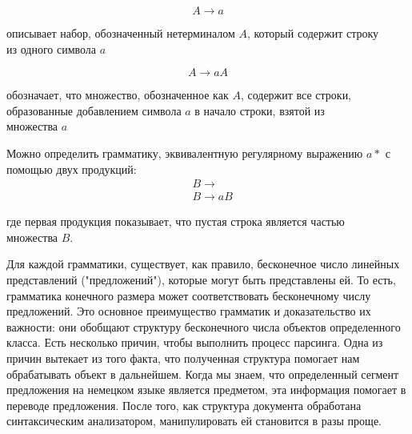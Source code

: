 \begin{equation}
  A \rightarrow a
\end{equation}
\begin{explanation}
описывает набор, обозначенный нетерминалом $A$, который содержит строку \\
из одного символа $a$
\end{explanation}

\begin{equation}
  A \rightarrow aA
\end{equation}
\begin{explanation}
обозначает, что множество, обозначенное как $A$, содержит все строки,\\
образованные добавлением символа $a$ в начало строки, взятой из \\ множества $a$
\end{explanation}
Можно определить  грамматику, эквивалентную регулярному выражению $a*$ с помощью двух продукций:
\begin{equation}
\begin{aligned}
  &B \rightarrow        \\
  &B \rightarrow aB
\end{aligned}
\end{equation}
\begin{explanation}
где первая продукция показывает, что пустая строка является частью \\
множества $B$.
\end{explanation}

Для каждой грамматики, существует, как правило, бесконечное число линейных представлений
("предложений"), которые могут быть представлены ей. То есть, грамматика конечного размера может соответствовать бесконечному числу предложений. Это основное преимущество грамматик
и доказательство их важности: они обобщают структуру бесконечного числа объектов определенного класса\cite{cfg_evidence}.
Есть несколько причин, чтобы выполнить процесс парсинга. Одна из
причин вытекает из того факта, что полученная структура помогает нам обрабатывать объект
в дальнейшем. Когда мы знаем, что определенный сегмент предложения на немецком языке является предметом,
эта информация помогает в переводе предложения. После того, как структура документа обработана синтаксическим анализатором, манипулировать ей становится в разы проще.
